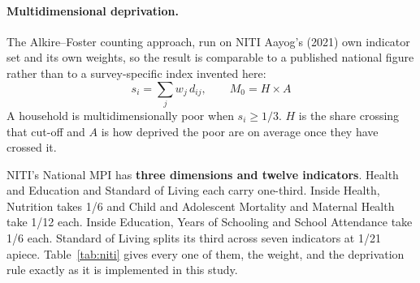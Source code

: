 \documentclass[11pt]{article}
\begin{document}
\paragraph{Multidimensional deprivation.} The Alkire--Foster counting approach, run on NITI
Aayog's (2021) own indicator set and its own weights, so the result is comparable to a
published national figure rather than to a survey-specific index invented here:
\begin{equation}
s_i = \sum_j w_j \, d_{ij}, \qquad M_0 = H \times A
\end{equation}
A household is multidimensionally poor when $s_i \geq 1/3$. $H$ is the share crossing that
cut-off and $A$ is how deprived the poor are on average once they have crossed it.

NITI's National MPI has \textbf{three dimensions and twelve indicators}. Health and Education
and Standard of Living each carry one-third. Inside Health, Nutrition takes 1/6 and Child and
Adolescent Mortality and Maternal Health take 1/12 each. Inside Education, Years of Schooling
and School Attendance take 1/6 each. Standard of Living splits its third across seven
indicators at 1/21 apiece. Table~\ref{tab:niti} gives every one of them, the weight, and the
deprivation rule exactly as it is implemented in this study.
\end{document}
